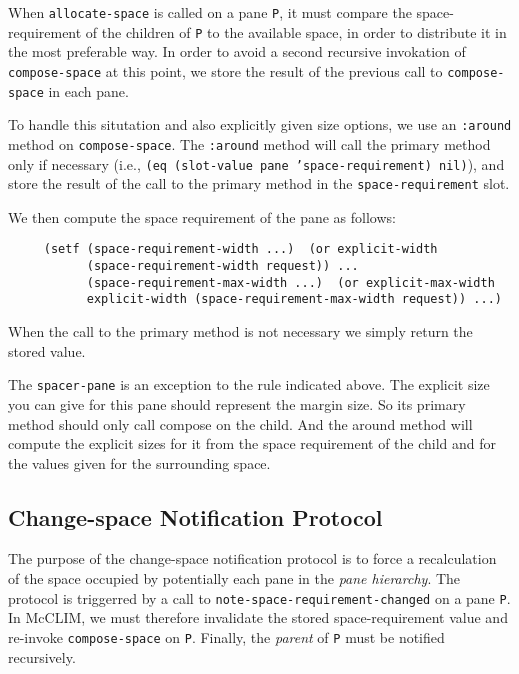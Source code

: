 When \texttt{allocate-space} is called on a pane \texttt{P}, it must
compare the space-requirement of the children of \texttt{P} to the
available space, in order to distribute it in the most preferable way.
In order to avoid a second recursive invokation of
\texttt{compose-space} at this point, we store the result of the
previous call to \texttt{compose-space} in each pane.

To handle this situtation and also explicitly given size options, we use
an \texttt{:around} method on \texttt{compose-space}.  The
\texttt{:around} method will call the primary method only if necessary
(i.e., \texttt{(eq (slot-value pane 'space-requirement) nil)}), and store
the result of the call to the primary method in the
\texttt{space-requirement} slot.

We then compute the space requirement of the pane as follows:

\begin{verbatim}
     (setf (space-requirement-width ...)  (or explicit-width
           (space-requirement-width request)) ...
           (space-requirement-max-width ...)  (or explicit-max-width
           explicit-width (space-requirement-max-width request)) ...)
\end{verbatim}

When the call to the primary method is not necessary we simply return
the stored value.

The \texttt{spacer-pane} is an exception to the rule indicated above.  The
explicit size you can give for this pane should represent the margin
size.  So its primary method should only call compose on the child.  And
the around method will compute the explicit sizes for it from the space
requirement of the child and for the values given for the surrounding
space.

\subsection{Change-space Notification Protocol}

The purpose of the change-space notification protocol is to force a
recalculation of the space occupied by potentially each pane in the
\emph{pane hierarchy}.  The protocol is triggerred by a call to
\texttt{note-space-requirement-changed} on a pane \texttt{P}. In McCLIM, we
must therefore invalidate the stored space-requirement value and
re-invoke \texttt{compose-space} on \texttt{P}.  Finally, the
\emph{parent} of \texttt{P} must be notified recursively.

